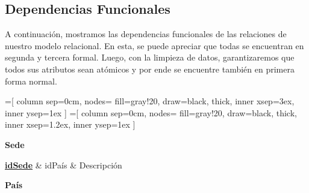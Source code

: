 \documentclass[10pt,a4paper]{article}
\begin{document}
\newpage

\subsection{Dependencias Funcionales} \vspace{0.1cm}

A continuación, mostramos las dependencias funcionales de las relaciones de nuestro modelo relacional. En esta, se puede apreciar que 
todas se encuentran en segunda y tercera formal. Luego, con la limpieza de datos, garantizaremos que todos sus atributos sean atómicos
y por ende se encuentre también en primera forma normal.  \vspace{0.3cm}

=[%
    column sep=0cm, %
    nodes={%
        fill=gray!20,
        draw=black,
        thick,
        inner xsep=3ex,
        inner ysep=1ex
    }
]
=[%
    column sep=0cm, %
    nodes={%
        fill=gray!20,
        draw=black,
        thick,
        inner xsep=1.2ex,
        inner ysep=1ex
    }
]


\textbf{Sede} \vspace{0.1cm}

\begin{dependency}
    \raggedright
    \begin{deptext}[TxtBookChico] %
        \textbf{\underline{idSede}}  \& idPaís \& Descripción\\
    \end{deptext}
\end{dependency} \vspace{0.3cm}
 \vspace{0.3cm}

\textbf{País} 
\vspace{0.1cm}
\end{document}
